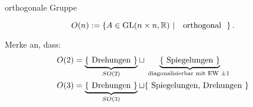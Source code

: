 \documentclass[class=article, crop=false]{standalone}
\begin{document}
\begin{zettel}{orthogonale Gruppe}
\begin{flashcard}[]{}
	\begin{definition}
		\[
			O (n):= \set{A \in  \GL(n \times n,\R )}{\tx{ orthogonal }}
		.\]
	\end{definition}
\end{flashcard}

Merke an, dass:
\begin{align*}
	O(2) & = \underbrace{\set{\tx{Drehungen}}}_{SO(2)} \sqcup \underbrace{\set{\tx{Spiegelungen}}}_\tx{diagonalisierbar mit EW $\pm 1$ } \\
	O(3) & = \underbrace{\set{\tx{Drehungen}}}_{SO(3)} \sqcup \set{\tx{Spiegelungen, Drehungen} }                                        \\
\end{align*}
\end{zettel}
\end{document}
